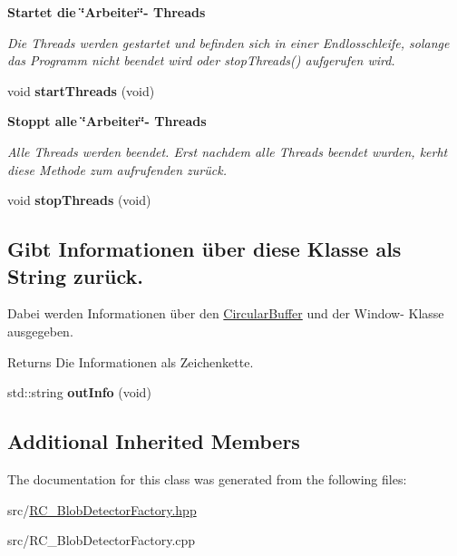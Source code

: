 \begin{Indent}{\bf Startet die \char`\"{}\+Arbeiter\char`\"{}-\/ Threads}\par
{\em Die Threads werden gestartet und befinden sich in einer Endlosschleife, solange das Programm nicht beendet wird oder stop\+Threads() aufgerufen wird. }\begin{DoxyCompactItemize}
\item 
\hypertarget{classrc_1_1BlobDetectorFactory_afecac9963fc4e69e51422ce59cf540f3}{void {\bfseries start\+Threads} (void)}\label{classrc_1_1BlobDetectorFactory_afecac9963fc4e69e51422ce59cf540f3}

\end{DoxyCompactItemize}
\end{Indent}
\begin{Indent}{\bf Stoppt alle \char`\"{}\+Arbeiter\char`\"{}-\/ Threads}\par
{\em Alle Threads werden beendet. Erst nachdem alle Threads beendet wurden, kerht diese Methode zum aufrufenden zurück. }\begin{DoxyCompactItemize}
\item 
\hypertarget{classrc_1_1BlobDetectorFactory_a9dc44508f5a3dd4beaee0813b7443194}{void {\bfseries stop\+Threads} (void)}\label{classrc_1_1BlobDetectorFactory_a9dc44508f5a3dd4beaee0813b7443194}

\end{DoxyCompactItemize}
\end{Indent}
\subsection*{Gibt Informationen über diese Klasse als String zurück.}
\label{_amgrp693de023182337ef13904b9f97f6b392}%
Dabei werden Informationen über den \hyperlink{classrc_1_1CircularBuffer}{Circular\+Buffer} und der Window-\/ Klasse ausgegeben.

\begin{DoxyReturn}{Returns}
Die Informationen als Zeichenkette. 
\end{DoxyReturn}
\begin{DoxyCompactItemize}
\item 
\hypertarget{classrc_1_1BlobDetectorFactory_a08e56c167bd2f928d2f808d429d8327e}{std\+::string {\bfseries out\+Info} (void)}\label{classrc_1_1BlobDetectorFactory_a08e56c167bd2f928d2f808d429d8327e}

\end{DoxyCompactItemize}
\subsection*{Additional Inherited Members}


The documentation for this class was generated from the following files\+:\begin{DoxyCompactItemize}
\item 
src/\hyperlink{RC__BlobDetectorFactory_8hpp}{R\+C\+\_\+\+Blob\+Detector\+Factory.\+hpp}\item 
src/R\+C\+\_\+\+Blob\+Detector\+Factory.\+cpp\end{DoxyCompactItemize}
